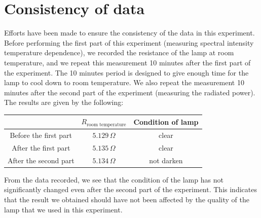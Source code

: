 \documentclass[11pt]{book}
\theoremstyle{break}
\theoremstyle{break}
\begin{document}
\section{Consistency of data}
Efforts have been made to ensure the consistency of the data in this experiment. Before performing the first part of this experiment (measuring spectral intensity temperature dependence), we recorded the resistance of the lamp at room temperature, and we repeat this measurement 10 minutes after the first part of the experiment. The 10 minutes period is designed to give enough time for the lamp to cool down to room temperature. We also repeat the measurement 10 minutes after the second part of the experiment (measuring the radiated power). The results are given by the following:
\begin{center}
\begin{tabular}{|c|c|c|}
\hline
& $R_{\text{room temperature}}$ & Condition of lamp \\
\hline
Before the first part & $5.129 \, \Omega$ & clear\\
\hline
After the first part & $5.135\, \Omega$ & clear \\
\hline
After the second part & $5.134\, \Omega$ & not darken\\
\hline
\end{tabular}
\end{center}
From the data recorded, we see that the condition of the lamp has not significantly changed even after the second part of the experiment. This indicates that the result we obtained should have not been affected by the quality of the lamp that we used in this experiment.\\
\end{document}
